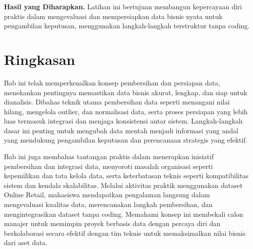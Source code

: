 \textbf{Hasil yang Diharapkan.}  
Latihan ini bertujuan membangun kepercayaan diri praktis dalam mengevaluasi dan mempersiapkan data bisnis nyata untuk pengambilan keputusan, menggunakan langkah-langkah terstruktur tanpa coding.

\section{Ringkasan}

Bab ini telah memperkenalkan konsep pembersihan dan persiapan data, menekankan pentingnya memastikan data bisnis akurat, lengkap, dan siap untuk dianalisis. Dibahas teknik utama pembersihan data seperti menangani nilai hilang, mengelola outlier, dan normalisasi data, serta proses persiapan yang lebih luas termasuk integrasi dan menjaga konsistensi antar sistem. Langkah-langkah dasar ini penting untuk mengubah data mentah menjadi informasi yang andal yang mendukung pengambilan keputusan dan perencanaan strategis yang efektif.

Bab ini juga membahas tantangan praktis dalam menerapkan inisiatif pembersihan dan integrasi data, menyoroti masalah organisasi seperti kepemilikan dan tata kelola data, serta keterbatasan teknis seperti kompatibilitas sistem dan kendala skalabilitas. Melalui aktivitas praktik menggunakan dataset Online Retail, mahasiswa mendapatkan pengalaman langsung dalam mengevaluasi kualitas data, merencanakan langkah pembersihan, dan mengintegrasikan dataset tanpa coding. Memahami konsep ini membekali calon manajer untuk memimpin proyek berbasis data dengan percaya diri dan berkolaborasi secara efektif dengan tim teknis untuk memaksimalkan nilai bisnis dari aset data.

